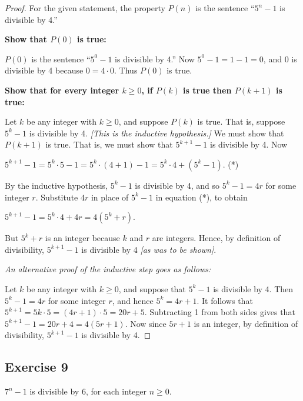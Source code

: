 \documentclass[14pt]{extarticle}
\begin{document}
\begin{proof}
For the given statement, the property $P(n)$ is the sentence “$5^n - 1$ is divisible by 4.” 

{\bf Show that $P(0)$ is true:} 

$P(0)$ is the sentence “$5^0 - 1$ is divisible by 4.” Now $5^0 - 1 = 1 - 1 = 0$, and 0 is divisible by 4 because $0 = 4 \cdot 0$. Thus $P(0)$ is true. 

{\bf Show that for every integer $k \geq 0$, if $P(k)$ is true then $P(k + 1)$ is true:} 

Let $k$ be any integer with $k \geq 0$, and suppose $P(k)$ is true. That is, suppose $5^k - 1$ is divisible by 4. {\it [This is the inductive hypothesis.]} We must show that $P(k + 1)$ is true. That is, we must show that $5^{k + 1} - 1$ is divisible by 4. Now 

$5^{k + 1} - 1 = 5^k \cdot 5 - 1 = 5^k \cdot (4 + 1) - 1 = 5^k \cdot 4 + (5^k - 1)$. (*) 

By the inductive hypothesis, $5^k - 1$ is divisible by 4, and so $5^k - 1 = 4r$ for some integer $r$. Substitute $4r$ in place of $5^k - 1$ in equation (*), to obtain 

$5^{k + 1} - 1 = 5^k \cdot 4 + 4r = 4(5^k + r)$. 

But $5^k + r$ is an integer because $k$ and $r$ are integers. Hence, by definition of divisibility, $5^{k + 1} - 1$ is divisible by 4 {\it [as was to be shown]}. 

{\it An alternative proof of the inductive step goes as follows:} 

Let $k$ be any integer with $k \geq 0$, and suppose that $5^k - 1$ is divisible by 4. Then $5^k - 1 = 4r$ for some integer $r$, and hence $5^k = 4r + 1$. It follows that $5^{k + 1} = 5k \cdot 5 = (4r + 1) \cdot 5 = 20r + 5$. Subtracting 1 from both sides gives that $5^{k + 1} - 1 = 20r + 4 = 4(5r + 1)$. Now since $5r + 1$ is an integer, by definition of divisibility, $5^{k + 1} - 1$ is divisible by 4.
\end{proof}

\subsection{Exercise 9}
$7^n - 1$ is divisible by 6, for each integer $n \geq 0$.
\end{document}
